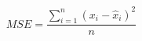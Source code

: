 \begin{equation}
MSE = \frac{\sum _{i=1}^{n} (x_{i}-\widehat{x}_{i})^{2}}{n}
\label{eq:meanSquareError}
\end{equation}